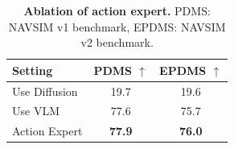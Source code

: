 \begin{table}[!t]\small
\centering
\setlength{\tabcolsep}{16pt}
\vspace{-2mm}
\caption{\textbf{Ablation of action expert.} 
PDMS: NAVSIM v1 \cite{navsim-v1} benchmark, EPDMS: NAVSIM v2 \cite{navsim-v2} benchmark. }
\vspace{-3mm}
\label{tab:ablation_architecture}
        \begin{tabular}{l|c|c}
            \toprule
            \textbf{Setting} & \textbf{PDMS $\uparrow$} & \textbf{EPDMS  $\uparrow$}\\ 
            \midrule
            Use Diffusion & 19.7 & 19.6  \\ 
            Use VLM & 77.6 & 75.7  \\ 
            Action Expert & \textbf{77.9} & \textbf{76.0} \\ 
            \bottomrule
        \end{tabular}
\vspace{-7mm}
\end{table}
